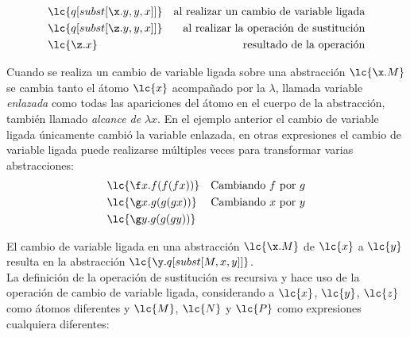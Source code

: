 \begin{align*}
  &\lc{q[subst[\x.y,y,x]]} &\text{al realizar un cambio de variable ligada} \\
  &\lc{q[subst[\z.y,y,x]]} &\text{al realizar la operación de sustitución} \\
  &\lc{\z.x}               &\text{resultado de la operación}
\end{align*}

Cuando se realiza un cambio de variable ligada sobre una abstracción
\(\lc{\x.M}\) se cambia tanto el átomo \(\lc{x}\) acompañado por la \(\lambda\),
llamada variable \emph{enlazada} como todas las apariciones del átomo
en el cuerpo de la abstracción, también llamado \emph{alcance de} \(\lambda x\).
En el ejemplo anterior el cambio de variable ligada únicamente cambió la
variable enlazada, en otras expresiones el cambio de variable ligada
puede realizarse múltiples veces para transformar varias abstracciones: \\

\begin{align*}
  &\lc{\f x.f(f(f x))} &\text{Cambiando \(f\) por \(g\)} \\
  &\lc{\g x.g(g(g x))} &\text{Cambiando \(x\) por \(y\)} \\
  &\lc{\g y.g(g(g y))} & \\
\end{align*}

El cambio de variable ligada en una abstracción \(\lc{\x.M}\) de \(\lc{x}\) a
\(\lc{y}\) resulta en la abstracción \(\lc{\y.q[subst[M,x,y]]}\). \\

La definición de la operación de sustitución es recursiva y hace uso de la
operación de cambio de variable ligada, considerando a \(\lc{x}\), \(\lc{y}\),
\(\lc{z}\) como átomos diferentes y \(\lc{M}\), \(\lc{N}\) y \(\lc{P}\) como
expresiones cualquiera diferentes:

